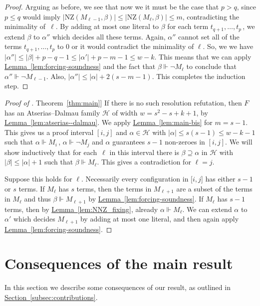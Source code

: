 \documentclass[11pt]{article}
\numberwithin{equation}{section}
\theoremstyle{definition}
\theoremstyle{plain}
\newcommand{\expref}[2]{\hyperref[#2]{#1~\ref{#2}}}
\newcommand\calH{\mathcal{H}}
\newcommand\rmNZ{\mathrm{NZ}}
\begin{document}
\begin{proof}
Arguing as before, we see that now we it must be the case that $p>q$,
since $p \le q$ would imply $|\rmNZ(M_{\ell-1}, \beta)| \le |\rmNZ(M_\ell, \beta)| \le m$, contradicting the minimality of~$\ell$.
By adding at most one literal to $\beta$ for each term $t_{q+1}, \dots, t_p$\,, 
we extend $\beta$ to $\alpha''$ which decides all these terms. Again,
$\alpha''$ cannot set all of the terms $t_{q+1}, \dots, t_p$ 
to $0$ or it would contradict the minimality of $\ell$.
So, we we have $|\alpha''| \le |\beta| + p-q-1 \le |\alpha'|+p-m-1
\le w-k$.
This means that we can apply \expref{Lemma}{lem:forcing-soundness} 
and the fact that $\beta \Vdash \neg M_\ell$ to conclude that $\alpha'' \Vdash \neg M_{\ell-1}$.
Also, $|\alpha''| \le |\alpha|+2(s-m-1)$. This completes the induction step.
\end{proof}

\begin{proof}[Proof of \expref{Theorem}{thm:main}]
If there is no such resolution refutation, then $F$ has an Atserias--Dalmau
family $\calH$ of width $w=s^2-s+k+1$, by \expref{Lemma}{lem:atserias--dalmau}.
We apply \expref{Lemma}{lem:main-bis} for $m=s-1$. 
This gives us 
a proof interval $[i, j]$
and $\alpha \in \calH$
with $|\alpha| \le s(s-1) \le w-k-1$ such that
$\alpha \Vdash M_i$\,, $\alpha \Vdash \neg M_j$
and $\alpha$ guarantees $s-1$ non-zeroes in $[i,j]$. 
We will show inductively that for each~$\ell$ in this interval
there is $\beta \supseteq \alpha$ in $\calH$ with $|\beta| \le |\alpha|+1$
such that
$\beta \Vdash M_{\ell}$. This gives a contradiction for $\ell = j$.

Suppose this holds for $\ell$. Necessarily every
configuration in $[i,j$] has either $s-1$ or $s$ terms.
 If $M_{\ell}$ has $s$ terms, then the terms
in $M_{\ell+1}$ are a subset of the terms in $M_{\ell}$ and
thus $\beta \Vdash M_{\ell+1}$ by 
\expref{Lemma}{lem:forcing-soundness}.
If $M_{\ell}$ has $s-1$ terms, then by 
\expref{Lemma}{lem:NNZ_fixing}, already $\alpha \Vdash M_{\ell}$.
We can extend $\alpha$ to~$\alpha'$ which decides $M_{\ell+1}$
by adding at most one literal, and then again apply
\expref{Lemma}{lem:forcing-soundness}.
\end{proof}




%
\section{Consequences of the main result}\label{sec:conseq}
%


In this section we describe some consequences of our result,
as outlined in \expref{Section}{subsec:contributions}.
 
\end{document}

